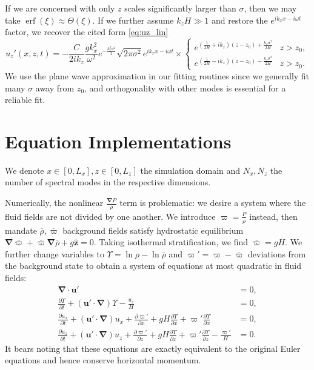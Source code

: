\documentclass[
        fleqn,
        usenatbib,
    ]{mnras}
\newcommand*{\pd}[2]{\frac{\partial#1}{\partial#2}}
\newcommand*{\p}[1]{\left(#1\right)}
\newcommand*{\bm}[1]{\mathbf{#1}}
\newcommand*{\uv}[1]{\hat{\mathbf{#1}}}
\DeclareMathOperator*{\erf}{erf}
\begin{document}
If we are concerned with only $z$ scales significantly larger than $\sigma$,
then we may take $\erf(\xi) \approx \Theta(\xi)$. If we further assume $k_zH \gg
1$ and restore the $e^{ik_xx - i\omega t}$ factor, we recover the cited form
\autoref{eq:uz_lin}
\begin{equation}
    u_{z}'(x, z, t) = -\frac{C}{2ik_z}\frac{gk_x^2}{\omega^2}
        e^{-\frac{k_z^2\sigma^2}{2}}
        \sqrt{2\pi \sigma^2} e^{ik_xx - i\omega t} \times
    \begin{cases}
        e^{\p{\frac{1}{2H} + ik_z}\p{z - z_0} + \frac{k_z\sigma^2}{2H}}
            & z > z_0,\\
        e^{\p{\frac{1}{2H} - ik_z}\p{z - z_0} - \frac{k_z\sigma^2}{2H}}
            & z > z_0.
    \end{cases}
\end{equation}
We use the plane wave approximation in our fitting routines since we generally
fit many $\sigma$ away from $z_0$, and orthogonality with other modes is
essential for a reliable fit.

\section{Equation Implementations}\label{se:strat_impl}

We denote $x \in [0, L_x], z \in [0, L_z]$ the simulation domain and $N_x, N_z$
the number of spectral modes in the respective dimensions.

Numerically, the nonlinear $\frac{\bm{\nabla}P}{\rho}$ term is problematic: we
desire a system where the fluid fields are not divided by one another. We
introduce $\varpi = \frac{P}{\rho}$ instead, then mandate $\overline{\rho},
\overline{\varpi}$ background fields satisfy hydrostatic equilibrium
$\bm{\nabla}\overline{\varpi} + \overline{\varpi} \bm{\nabla}\overline{\rho} +
g\uv{z} = 0$. Taking isothermal stratification, we find $\overline{\varpi} = gH$. We
further change variables to $\Upsilon = \ln \rho - \ln \overline{\rho}$ and
$\varpi' = \varpi - \overline{\varpi}$ deviations from the background state to obtain a
system of equations at most quadratic in fluid fields:
\begin{subequations}\label{se:nl_var}
    \begin{align}
        \bm{\nabla} \cdot \bm{u}' &= 0,\\
        \pd{\Upsilon}{t} + \p{\bm{u}' \cdot \bm{\nabla}} \Upsilon
            - \frac{u_z}{H} &= 0,\\
        \pd{u_{x}}{t} + \p{\bm{u}' \cdot \bm{\nabla}}u_{x}
            + \pd{\varpi'}{x} + gH\pd{\Upsilon}{x}
            + \varpi' \pd{\Upsilon}{x} &= 0,\\
        \pd{u_z}{t} + \p{\bm{u}' \cdot \bm{\nabla}}u_z
            + \pd{\varpi'}{z} + gH\pd{\Upsilon}{z}
            + \varpi' \pd{\Upsilon}{z} - \frac{\varpi'}{H} &= 0.
    \end{align}
\end{subequations}
It bears noting that these equations are exactly equivalent to the original
Euler equations and hence conserve horizontal momentum.
\end{document}
